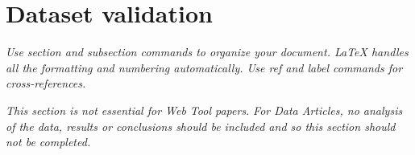 \section*{Dataset validation}
\textit{Use section and subsection commands to organize your document. \LaTeX{} handles all the formatting and numbering automatically. Use ref and label commands for cross-references.}

\textit{This section is not essential for Web Tool papers. }
\textit{For Data Articles, no analysis of the data, results or conclusions should be included and so this section should not be completed. }